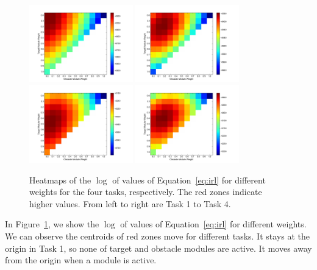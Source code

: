 \documentclass[11pt]{article} %
\begin{document}
\begin{figure}[h!]
\centering
\includegraphics[width=0.4\textwidth]{objValuesTask1.png}
\includegraphics[width=0.4\textwidth]{objValuesTask2.png}
\includegraphics[width=0.4\textwidth]{objValuesTask3.png}
\includegraphics[width=0.4\textwidth]{objValuesTask4.png}
\caption{Heatmaps of the $\log$ of values of Equation~\ref{eq:irl} for different
weights for the four tasks, respectively. The red zones indicate higher values.
From left to right are Task 1 to Task 4.}
\label{fig:heatmap}
\end{figure}

In Figure~\ref{fig:heatmap}, we show the $\log$ of values of Equation~\ref{eq:irl} for
different weights. We can observe the centroids of red zones move for different
tasks. It stays at the origin in Task 1, so none of target and obstacle modules
are active. It moves away from the origin when a module is active.
\end{document}
